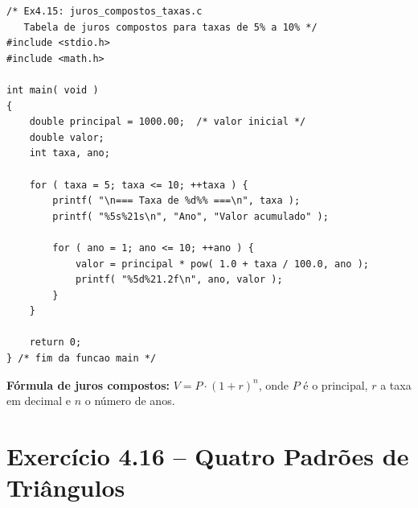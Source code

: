 \documentclass[12pt,a4paper]{article}
\begin{document}
\begin{respostabox}
\begin{lstlisting}
/* Ex4.15: juros_compostos_taxas.c
   Tabela de juros compostos para taxas de 5% a 10% */
#include <stdio.h>
#include <math.h>

int main( void )
{
    double principal = 1000.00;  /* valor inicial */
    double valor;
    int taxa, ano;

    for ( taxa = 5; taxa <= 10; ++taxa ) {
        printf( "\n=== Taxa de %d%% ===\n", taxa );
        printf( "%5s%21s\n", "Ano", "Valor acumulado" );

        for ( ano = 1; ano <= 10; ++ano ) {
            valor = principal * pow( 1.0 + taxa / 100.0, ano );
            printf( "%5d%21.2f\n", ano, valor );
        }
    }

    return 0;
} /* fim da funcao main */
\end{lstlisting}

\textbf{Fórmula de juros compostos:} $V = P \cdot (1 + r)^n$, onde $P$ é o principal,
$r$ a taxa em decimal e $n$ o número de anos.
\end{respostabox}

\newpage

\section{Exercício 4.16 -- Quatro Padrões de Triângulos}
\end{document}
